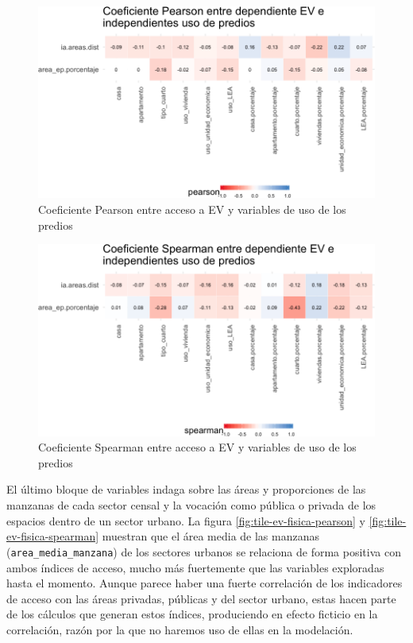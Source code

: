 \documentclass[12pt,]{book}
\begin{document}
\begin{figure}
\includegraphics[width=1\linewidth]{tesis-unigis_files/figure-latex/tile-ev-uso-pearson-1} \caption{Coeficiente Pearson entre acceso a EV y variables de uso de los predios}\label{fig:tile-ev-uso-pearson}
\end{figure}

\begin{figure}
\includegraphics[width=1\linewidth]{tesis-unigis_files/figure-latex/tile-ev-uso-spearman-1} \caption{Coeficiente Spearman entre acceso a EV y variables de uso de los predios}\label{fig:tile-ev-uso-spearman}
\end{figure}

El último bloque de variables indaga sobre las áreas y proporciones de
las manzanas de cada sector censal y la vocación como pública o privada
de los espacios dentro de un sector urbano. La figura
\ref{fig:tile-ev-fisica-pearson} y \ref{fig:tile-ev-fisica-spearman}
muestran que el área media de las manzanas
(\texttt{area\_media\_manzana}) de los sectores urbanos se relaciona de
forma positiva con ambos índices de acceso, mucho más fuertemente que
las variables exploradas hasta el momento. Aunque parece haber una
fuerte correlación de los indicadores de acceso con las áreas privadas,
públicas y del sector urbano, estas hacen parte de los cálculos que
generan estos índices, produciendo en efecto ficticio en la correlación,
razón por la que no haremos uso de ellas en la modelación.
\end{document}
